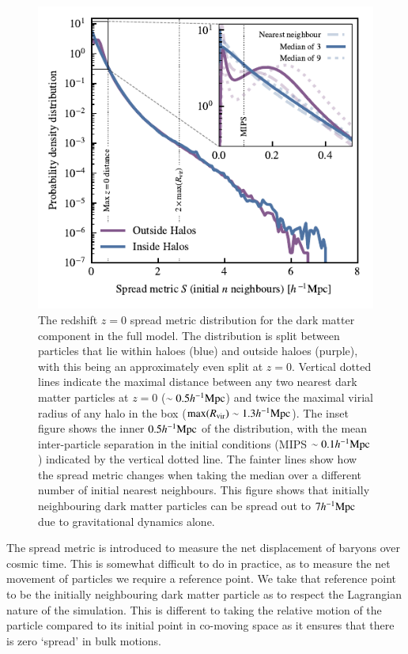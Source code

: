 \begin{figure}
    \centering
    \includegraphics{figures/s50j7kAHF/dark_matter_distance_figure_s50j7k_AHF}
    \vspace{-0.7cm}
    \caption{The redshift $z=0$ spread metric distribution for the dark
    matter component in the full \simba{} model. The distribution is split
    between particles that lie within haloes (blue) and outside haloes
    (purple), with this being an approximately even split at $z=0$. Vertical
    dotted lines indicate the maximal distance between any two nearest dark
    matter particles at $z=0$ ($\sim 0.5h^{-1}{\rm Mpc}{}$) and twice the maximal
    virial radius of any halo in the box (${\rm max}(R_{\rm vir}) \sim
    1.3h^{-1}{\rm Mpc}{}$). The inset figure shows the inner $0.5h^{-1}{\rm Mpc}{}$ of the
    distribution, with the mean inter-particle separation in the initial
    conditions (MIPS $\sim 0.1h^{-1}{\rm Mpc}$) indicated by the vertical dotted line.
    The fainter lines show how the spread metric changes when taking the
    median over a different number of initial nearest neighbours.
    This figure shows that initially neighbouring dark matter particles
    can be spread out to $7h^{-1}{\rm Mpc}{}$ due to gravitational dynamics alone.}
    \label{fig:dmonlyspread}
\end{figure}


The spread metric is introduced to measure the net displacement of baryons over
cosmic time. This is somewhat difficult to do in practice, as to measure the
net movement of particles we require a reference point. We take that
reference point to be the initially neighbouring dark matter particle as to
respect the Lagrangian nature of the simulation. This is different to taking the
relative motion of the particle compared to its initial point in co-moving space
as it ensures that there is zero `spread' in bulk motions.

